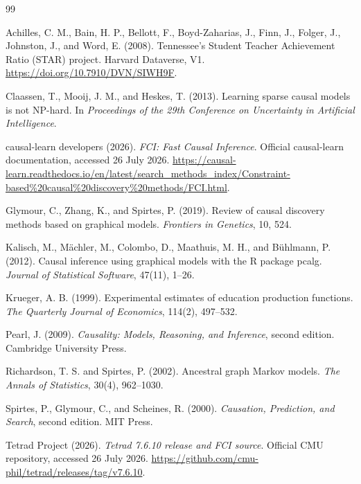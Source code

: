 \documentclass[11pt,a4paper,oneside]{report}
\begin{document}
\begin{thebibliography}{99}

Achilles, C. M., Bain, H. P., Bellott, F., Boyd-Zaharias, J., Finn, J.,
Folger, J., Johnston, J., and Word, E. (2008).
Tennessee's Student Teacher Achievement Ratio (STAR) project.
Harvard Dataverse, V1.
\url{https://doi.org/10.7910/DVN/SIWH9F}.

Claassen, T., Mooij, J. M., and Heskes, T. (2013).
Learning sparse causal models is not NP-hard.
In \textit{Proceedings of the 29th Conference on Uncertainty in Artificial
Intelligence}.

causal-learn developers (2026).
\textit{FCI: Fast Causal Inference}.
Official causal-learn documentation, accessed 26 July 2026.
\url{https://causal-learn.readthedocs.io/en/latest/search_methods_index/Constraint-based\%20causal\%20discovery\%20methods/FCI.html}.

Glymour, C., Zhang, K., and Spirtes, P. (2019).
Review of causal discovery methods based on graphical models.
\textit{Frontiers in Genetics}, 10, 524.

Kalisch, M., M{\"a}chler, M., Colombo, D., Maathuis, M. H., and
B{\"u}hlmann, P. (2012).
Causal inference using graphical models with the R package pcalg.
\textit{Journal of Statistical Software}, 47(11), 1--26.

Krueger, A. B. (1999).
Experimental estimates of education production functions.
\textit{The Quarterly Journal of Economics}, 114(2), 497--532.

Pearl, J. (2009).
\textit{Causality: Models, Reasoning, and Inference}, second edition.
Cambridge University Press.

Richardson, T. S. and Spirtes, P. (2002).
Ancestral graph Markov models.
\textit{The Annals of Statistics}, 30(4), 962--1030.

Spirtes, P., Glymour, C., and Scheines, R. (2000).
\textit{Causation, Prediction, and Search}, second edition.
MIT Press.

Tetrad Project (2026).
\textit{Tetrad 7.6.10 release and FCI source}.
Official CMU repository, accessed 26 July 2026.
\url{https://github.com/cmu-phil/tetrad/releases/tag/v7.6.10}.


\end{thebibliography}
\end{document}
